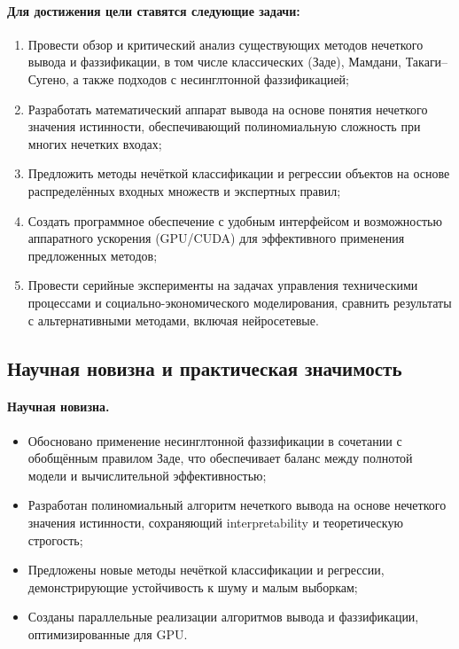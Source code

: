 \paragraph{Для достижения цели ставятся следующие задачи:}
\begin{enumerate}
  \item Провести обзор и критический анализ существующих методов нечеткого вывода и фаззификации, в том числе классических (Заде), Мамдани, Такаги–Сугено, а также подходов с несинглтонной фаззификацией;
  \item Разработать математический аппарат вывода на основе понятия нечеткого значения истинности, обеспечивающий полиномиальную сложность при многих нечетких входах;
  \item Предложить методы нечёткой классификации и регрессии объектов на основе распределённых входных множеств и экспертных правил;
  \item Создать программное обеспечение с удобным интерфейсом и возможностью аппаратного ускорения (GPU/CUDA) для эффективного применения предложенных методов;
  \item Провести серийные эксперименты на задачах управления техническими процессами и социально-экономического моделирования, сравнить результаты с альтернативными методами, включая нейросетевые.
\end{enumerate}

\subsection{Научная новизна и практическая значимость}

\paragraph{Научная новизна.}

\begin{itemize}
  \item Обосновано применение несинглтонной фаззификации в сочетании с обобщённым правилом Заде, что обеспечивает баланс между полнотой модели и вычислительной эффективностью;
  \item Разработан полиномиальный алгоритм нечеткого вывода на основе нечеткого значения истинности, сохраняющий interpretability и теоретическую строгость;
  \item Предложены новые методы нечёткой классификации и регрессии, демонстрирующие устойчивость к шуму и малым выборкам;
  \item Созданы параллельные реализации алгоритмов вывода и фаззификации, оптимизированные для GPU.
\end{itemize}


